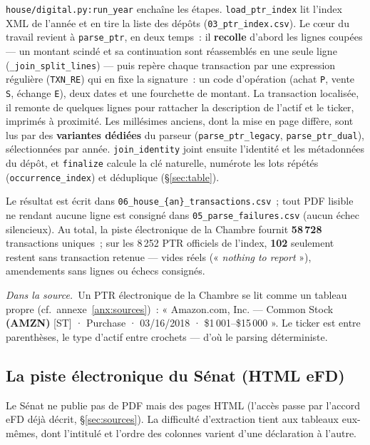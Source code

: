\documentclass[11pt,a4paper]{article}
\newcommand{\co}[1]{\texttt{\small #1}}
\newcommand{\srcex}[1]{\par\smallskip\noindent{\color{black!55}\rule{2pt}{\baselineskip}}\hspace{6pt}\begin{minipage}{\dimexpr\linewidth-16pt}\small\textit{Dans la source.}\ #1\end{minipage}\par\smallskip}
\begin{document}
\co{house/digital.py:run_year} enchaîne les étapes. \co{load_ptr_index} lit l'index XML de l'année et en
tire la liste des dépôts (\co{03_ptr_index.csv}). Le cœur du travail revient à \co{parse_ptr}, en deux
temps~: il \textbf{recolle} d'abord les lignes coupées — un montant scindé et sa continuation sont
réassemblés en une seule ligne (\co{_join_split_lines}) — puis repère chaque transaction par une expression
régulière (\co{TXN_RE}) qui en fixe la signature~: un code d'opération (achat \co{P}, vente \co{S}, échange
\co{E}), deux dates et une fourchette de montant. La transaction localisée, il remonte de quelques lignes
pour rattacher la description de l'actif et le ticker, imprimés à proximité. Les millésimes anciens, dont
la mise en page diffère, sont lus par des \textbf{variantes dédiées} du parseur (\co{parse_ptr_legacy},
\co{parse_ptr_dual}), sélectionnées par année. \co{join_identity} joint ensuite l'identité et les
métadonnées du dépôt, et \co{finalize} calcule la clé naturelle, numérote les lots répétés
(\co{occurrence_index}) et déduplique (\S{}\ref{sec:table}).

Le résultat est écrit dans \co{06_house_\{an\}_transactions.csv}~; tout PDF lisible ne rendant aucune ligne
est consigné dans \co{05_parse_failures.csv} (aucun échec silencieux). Au total, la piste électronique de la
Chambre fournit \textbf{58\,728} transactions uniques~; sur les 8\,252 PTR officiels de l'index, \textbf{102}
seulement restent sans transaction retenue — vides réels (« \emph{nothing to report} »), amendements sans
lignes ou échecs consignés.

\srcex{Un PTR électronique de la Chambre se lit comme un tableau propre (cf.~annexe~\ref{anx:sources})~:
« Amazon.com, Inc. — Common Stock \textbf{(AMZN)} [ST] · Purchase · 03/16/2018 · \$1\,001--\$15\,000 ».
Le ticker est entre parenthèses, le type d'actif entre crochets — d'où le parsing déterministe.}

\subsection{La piste électronique du Sénat (HTML eFD)}
\label{sec:sdig}
Le Sénat ne publie pas de PDF mais des pages HTML (l'accès passe par l'accord eFD déjà décrit,
\S{}\ref{sec:sources}). La difficulté d'extraction tient aux tableaux eux-mêmes, dont l'intitulé et l'ordre des
colonnes varient d'une déclaration à l'autre.
\end{document}
